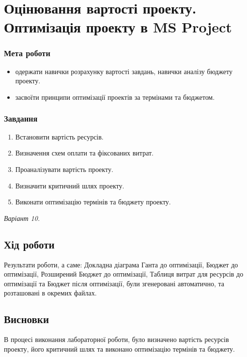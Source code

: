 



\newcommand{\labnumber}{3}



\graphicspath{{figures/}}


\Ukrainian


\addtocounter{page}{1}

\section*{Оцінювання вартості проекту. Оптимізація проекту в MS Project}
\subsubsection*{Мета роботи}
\begin{itemize}
	\item одержати навички розрахунку вартості завдань, навички аналізу бюджету проекту.
	\item засвоїти принципи оптимізації проектів за термінами та бюджетом.
\end{itemize}

\subsubsection*{Завдання}
\begin{enumerate}
  	\item Встановити вартість ресурсів.
  	\item Визначення схем оплати та фіксованих витрат.
  	\item Проаналізувати вартість проекту.
  	\item Визначити критичний шлях проекту.
  	\item Виконати оптимізацію термінів та бюджету проекту.
\end{enumerate}

\textit{Варіант 10.}

\subsection*{Хід роботи}
Результати роботи, а саме: Докладна діаграма Ганта до оптимізації, Бюджет до оптимізації, Розширений Бюджет до оптимізації, Таблиця витрат для ресурсів до оптимізації та Бюджет після оптимізації, були згенеровані автоматично, та розташовані в окремих файлах.

\subsection*{Висновки}
В процесі виконання лабораторної роботи, було визначено вартість ресурсів проекту, його критичний шлях та виконано оптимізацію термінів та бюджету.


